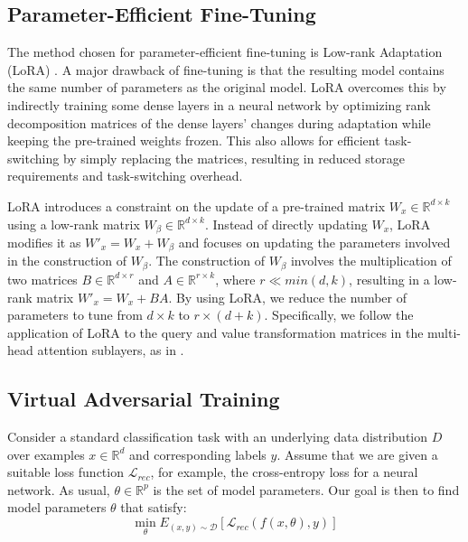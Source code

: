 \documentclass[letterpaper]{article} %
\begin{document}
\subsection{Parameter-Efficient Fine-Tuning}
The method chosen for parameter-efficient fine-tuning is Low-rank Adaptation (LoRA) \citep{hu2021lora}. A major drawback of fine-tuning is that the resulting model contains the same number of parameters as the original model. LoRA overcomes this by indirectly training some dense layers in a neural network by optimizing rank decomposition matrices of the dense layers' changes during adaptation while keeping the pre-trained weights frozen. This also allows for efficient task-switching by simply replacing the matrices, resulting in reduced storage requirements and task-switching overhead.

LoRA \citep{hu2021lora} introduces a constraint on the update of a pre-trained matrix $W_x \in \mathbb{R}^{d \times k}$ using a low-rank matrix $W_{\beta} \in \mathbb{R}^{d \times k}$. Instead of directly updating $W_x$, LoRA modifies it as $W'_x = W_x + W_{\beta}$ and focuses on updating the parameters involved in the construction of $W_{\beta}$. The construction of $W_{\beta}$ involves the multiplication of two matrices $B \in \mathbb{R}^{d \times r}$ and $A \in \mathbb{R}^{r \times k}$, where $r \ll min(d, k)$, resulting in a low-rank matrix $W'_x = W_x + BA$. By using LoRA, we reduce the number of parameters to tune from $d \times k$ to $r \times (d + k)$. Specifically, we follow the application of LoRA to the query and value transformation matrices in the multi-head attention sublayers, as in \citet{hu2021lora}.

\subsection{Virtual Adversarial Training}
Consider a standard classification task with an underlying data distribution $D$ over examples $x \in \mathbb{R}^d$ and corresponding labels $y$. Assume that we are given a suitable loss function $\mathcal{L}_{rec}$, for example, the cross-entropy loss for a neural network. As usual, $\theta \in \mathbb{R}^p$ is the set of model parameters. Our goal is then to find model parameters $\theta$ that satisfy:
\begin{equation}
    \min_{\theta}E_{(x,y)\sim \mathcal{D}}[\mathcal{L}_{rec}(f(x,\theta), y)]
    \label{eq:emperical_risk}
\end{equation}
\end{document}
